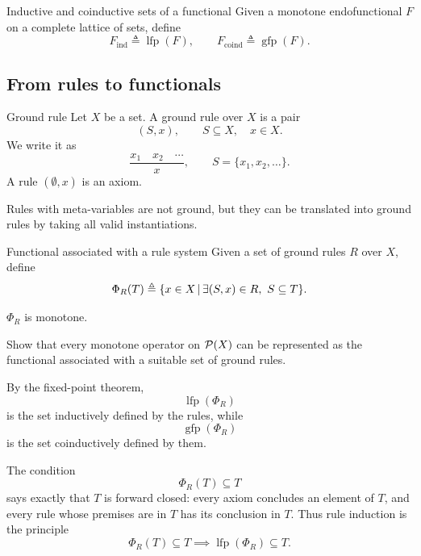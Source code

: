 \documentclass[a4paper]{article}
\newcommand{\lfp}{\operatorname{lfp}}
\newcommand{\gfp}{\operatorname{gfp}}
\begin{document}
\begin{snippetdefinition}{Inductive and coinductive sets of a functional}
    Given a monotone endofunctional \(F\) on a complete lattice of sets, define
    \[
        F_{\mathrm{ind}}
        \triangleq
        \lfp(F),
        \qquad
        F_{\mathrm{coind}}
        \triangleq
        \gfp(F).
    \]
\end{snippetdefinition}

\subsection{From rules to functionals}

\begin{snippetdefinition}{Ground rule}
    Let \(X\) be a set.
    A ground rule over \(X\) is a pair
    \[
        (S,x),
        \qquad
        S\subseteq X,
        \quad
        x\in X.
    \]
    We write it as
    \[
        \frac{x_1\quad x_2\quad\cdots}{x},
        \qquad
        S=\{x_1,x_2,\ldots\}.
    \]
    A rule \((\emptyset,x)\) is an axiom.
\end{snippetdefinition}

Rules with meta-variables are not ground, but they can be translated into ground rules by taking all valid instantiations.

\begin{snippetdefinition}{Functional associated with a rule system}
    Given a set of ground rules \(R\) over \(X\), define
    \[
        \Phi_R(T)
        \triangleq
        \{x\in X\,|\,
        \exists (S,x)\in R,\ S\subseteq T\}.
    \]
\end{snippetdefinition}

\begin{snippetproposition}{}
    \(\Phi_R\) is monotone.
\end{snippetproposition}

\begin{snippetexercise}{}
    Show that every monotone operator on \(\mathcal P(X)\) can be represented as the functional associated with a suitable set of ground rules.
\end{snippetexercise}

By the fixed-point theorem,
\[
    \lfp(\Phi_R)
\]
is the set inductively defined by the rules, while
\[
    \gfp(\Phi_R)
\]
is the set coinductively defined by them.

The condition
\[
    \Phi_R(T)\subseteq T
\]
says exactly that \(T\) is forward closed: every axiom concludes an element of \(T\), and every rule whose premises are in \(T\) has its conclusion in \(T\).
Thus rule induction is the principle
\[
    \Phi_R(T)\subseteq T
    \implies
    \lfp(\Phi_R)\subseteq T.
\]
\end{document}
